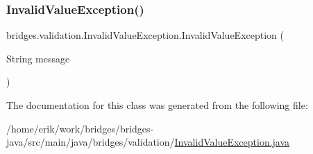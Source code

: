 \subsubsection{\texorpdfstring{Invalid\+Value\+Exception()}{InvalidValueException()}}
{\footnotesize\ttfamily bridges.\+validation.\+Invalid\+Value\+Exception.\+Invalid\+Value\+Exception (\begin{DoxyParamCaption}\item[{String}]{message }\end{DoxyParamCaption})}



The documentation for this class was generated from the following file\+:\begin{DoxyCompactItemize}
\item 
/home/erik/work/bridges/bridges-\/java/src/main/java/bridges/validation/\hyperlink{_invalid_value_exception_8java}{Invalid\+Value\+Exception.\+java}\end{DoxyCompactItemize}
